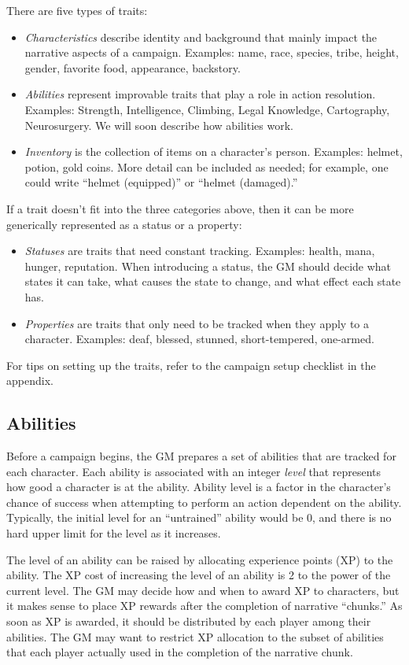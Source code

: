 There are five types of traits:
\begin{itemize}
\item
\emph{Characteristics} describe identity and background that mainly impact the narrative aspects of a campaign.
Examples: name, race, species, tribe, height, gender, favorite food, appearance, backstory.
\item
\emph{Abilities} represent improvable traits that play a role in action resolution.
Examples: Strength, Intelligence, Climbing, Legal Knowledge, Cartography, Neurosurgery.
We will soon describe how abilities work.
\item
\emph{Inventory} is the collection of items on a character’s person.
Examples: helmet, potion, gold coins.
More detail can be included as needed; for example, one could write ``helmet (equipped)'' or ``helmet (damaged).''
\end{itemize}
If a trait doesn’t fit into the three categories above, then it can be more generically represented as a status or a property:
\begin{itemize}
\item
\emph{Statuses} are traits that need constant tracking.
Examples: health, mana, hunger, reputation.
When introducing a status, the GM should decide what states it can take, what causes the state to change, and what effect each state has.
\item
\emph{Properties} are traits that only need to be tracked when they apply to a character.
Examples: deaf, blessed, stunned, short-tempered, one-armed.
\end{itemize}

For tips on setting up the traits, refer to the campaign setup checklist in the appendix.

\subsection{Abilities}
\label{sec:abilities}
Before a campaign begins, the GM prepares a set of abilities that are tracked for each character.
Each ability is associated with an integer \emph{level} that represents how good a character is at the ability.
Ability level is a factor in the character’s chance of success when attempting to perform an action dependent on the ability.
Typically, the initial level for an ``untrained'' ability would be $0$, and there is no hard upper limit for the level as it increases.

The level of an ability can be raised by allocating experience points (XP) to the ability.
The XP cost of increasing the level of an ability is 2 to the power of the current level.
The GM may decide how and when to award XP to characters, but it makes sense to place XP rewards after the completion of narrative ``chunks.''
As soon as XP is awarded, it should be distributed by each player among their abilities.
The GM may want to restrict XP allocation to the subset of abilities that each player actually used in the completion of the narrative chunk.

